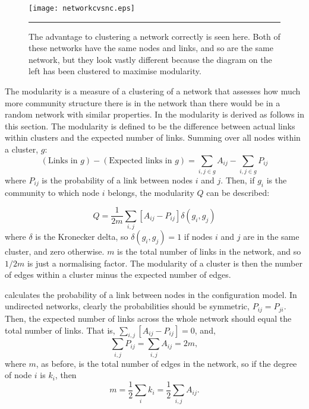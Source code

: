 \begin{figure}[htb]
  \centering
  \texttt{[image: networkcvsnc.eps]}
  \bigskip
  \rule{33em}{0.5pt}
  \caption{The advantage to clustering a network correctly is seen here.  Both 
    of these networks have the same nodes and links, and so are the same 
    network, but they look vastly different because the diagram on the left 
    has been clustered to maximise modularity.}
  \label{netclus}
\end{figure}

The modularity is a measure of a clustering of a network that assesses 
how much more community structure there is in the network than there would be 
in a random network with similar properties.  In \citep{Newman2006b,Newman2006a} the modularity is derived as follows in this section. The modularity is defined to be the difference between actual links within clusters and the expected number of links.  Summing over all nodes within a cluster, $g$:
\begin{equation}
(\text{Links in }g) - (\text{Expected links in }g) = \sum_{i,j \in g}  A_{ij} - \sum_{i,j \in g} P_{ij} 
\end{equation}
where $P_{ij}$ is the 
probability of a link between nodes $i$ and $j$. Then, if $g_i$ is the 
community to which node $i$ belongs, the modularity $Q$ can be described:

\begin{equation}
Q = \frac{1}{2m}\sum_{i,j}[A_{ij} - P_{ij}]\delta(g_i,g_j)
\end{equation}
where $\delta$ is the Kronecker delta, so $\delta(g_i,g_j)=1$ if nodes 
$i$ and $j$ are in the same cluster, and zero otherwise. $m$ is the total 
number of links in the network, and so $1/2m$ is just a normalising 
factor.  The modularity of a cluster is then the number of edges within a 
cluster minus the expected number of edges.

\citet{Newman2006b,Newman2006a} calculates the probability of a link between nodes in the configuration model.  In undirected networks, 
clearly the probabilities should be symmetric, $P_{ij} = P_{ji}$.  Then, the expected number of links across the whole network should equal the total number of links.   That is, $\sum_{i,j}[A_{ij} - P_{ij}] = 0$, and,
\begin{equation}
\sum_{i,j}P_{ij} = \sum_{i,j} A_{ij} = 2m,
\end{equation}
where $m$, as before, is the total number of edges in the network, so if the 
degree of node $i$ is $k_i$, then
\begin{equation}
m = \frac{1}{2}\sum_i k_i = \frac{1}{2}\sum_{i,j} A_{ij}.
\end{equation}

